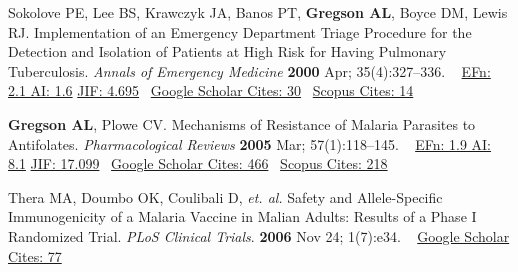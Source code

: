 \documentclass[letterpaper,10pt,sans,dvipsnames,final]{moderncv}%
\begin{document}
\closesection{}
\renewcommand{\refname}{Publications---Research Papers---Peer Reviewed}
\begin{thebibliography}{1}
 \bibitem[1]{} Sokolove PE, Lee BS, Krawczyk JA, Banos PT, \textbf{Gregson AL}, Boyce DM, Lewis RJ. Implementation of an Emergency Department Triage Procedure for the Detection and Isolation of Patients at High Risk for Having Pulmonary Tuberculosis. {\color{BrickRed}\textit{Annals of Emergency Medicine}} \textbf{2000} Apr; 35(4):327--336. \href{http://dx.doi.org/10.1016/S0196-0644(00)70050-3}{\aiDoi}~ 
   {\color{NavyBlue}\href{http://www.eigenfactor.org/detail.php?year=2006&jrlname=ANN%20EMERG%20MED&issnnum=0196-0644}{{\smaller EFn: 2.1 AI: 1.6}} 
       \href{http://admin-apps.isiknowledge.com/JCR/JCR?RQ=RECORD&rank=1&journal=ANN+EMERG+MED}{{\smaller JIF: 4.695}}~ 
       \href{http://scholar.google.com/scholar?cites=10844131317441698410&as_sdt=2005&sciodt=0,5&hl=en}{{\smaller Google Scholar Cites: 30}}~
       \href{http://www.scopus.com/record/display.url?eid=2-s2.0-0033900820&origin=inward&txGid=VWsBqLSNMzShrBOla5xyIwt%3a8}{{\smaller Scopus Cites: 14}}
       }

 \bibitem[2]{} \textbf{Gregson AL}, Plowe CV. Mechanisms of Resistance of Malaria Parasites to Antifolates. {\color{BrickRed}\textit{Pharmacological Reviews}} \textbf{2005} Mar; 57(1):118--145. \href{http://dx.doi.org/10.1124/pr.57.1.4}{\aiDoi}~ 
     {\color{NavyBlue}\href{http://www.eigenfactor.org/detail.php?year=2006&jrlname=PHARMACOL%20REV&issnnum=0031-6997}{{\smaller EFn: 1.9 AI: 8.1}} 
         \href{http://admin-apps.isiknowledge.com/JCR/JCR?RQ=RECORD&rank=1&journal=PHARMACOL+REV}{{\smaller JIF: 17.099}}~ 
         \href{http://scholar.google.com/scholar?cites=686331982961384450&as_sdt=2005&sciodt=0,5&hl=en}{{\smaller Google Scholar Cites: 466}}~
         \href{http://www.scopus.com/record/display.url?eid=2-s2.0-14144253009&origin=inward&txGid=2728424DD3A06399B3857C04F09A7B4B.N5T5nM1aaTEF8rE6yKCR3A%3a33}{{\smaller Scopus Cites: 218}}
         }

 \bibitem[3]{} Thera MA, Doumbo OK, Coulibali D, \emph{et. al.} Safety and Allele-Specific Immunogenicity of a Malaria Vaccine in Malian Adults: Results of a Phase I Randomized Trial.  {\color{BrickRed}\textit{PLoS Clinical Trials}}.  \textbf{2006} Nov 24; 1(7):e34. \href{http://dx.doi.org/10.1371/journal.pctr.0010034}{\aiDoi}~ 
   {\color{NavyBlue}\href{http://scholar.google.com/scholar?cites=2534822405987072634&as_sdt=2005&sciodt=0,5&hl=en}{{\smaller Google Scholar Cites: 77}}
     }



\end{thebibliography}
\end{document}
